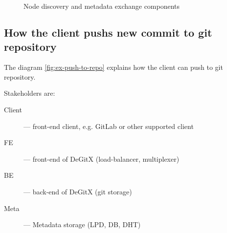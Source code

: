\documentclass[nonacm=true]{acmart}
\begin{document}
\begin{figure}
  \begin{center}
  \end{center}
  \caption{Node discovery and metadata exchange components}
  \label{fig:ex-node-lookup}
\end{figure}

\subsection{How the client pushs new commit to git repository}

The diagram \ref{fig:ex-push-to-repo} explains how the client can push to git repository.

Stakeholders are:
\begin{description}
  \item[Client] --- front-end client, e.g. GitLab or other supported client
  \item[FE] --- front-end of DeGitX (load-balancer, multiplexer)
  \item[BE] --- back-end of DeGitX (git storage)
  \item[Meta] --- Metadata storage (LPD, DB, DHT)
\end{description}
\end{document}
